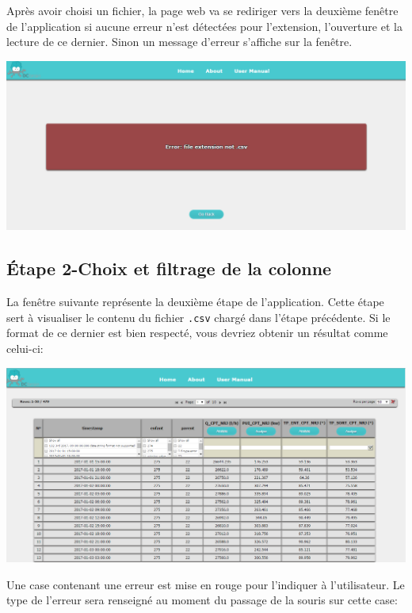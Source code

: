 		Après avoir choisi un fichier, la page web va se rediriger vers la deuxième fenêtre de l'application si aucune erreur n'est détectées pour l'extension, l'ouverture et la lecture de ce dernier. Sinon un message d'erreur s'affiche sur la fenêtre.\\
		
				
	\begin{center}\includegraphics[scale=0.45]{fenetreErreur.png}\end{center}
			
	\subsection{Étape 2-Choix et filtrage de la colonne}
	
		La fenêtre suivante représente la deuxième étape de l'application. Cette étape sert à visualiser le contenu du fichier \lstinline!.csv! chargé dans l'étape précédente. Si le format de ce dernier est bien respecté, vous devriez obtenir un résultat comme celui-ci:\\
		\begin{center}\includegraphics[scale=0.45]{fenetre2.png}\end{center}
		
		Une case contenant une erreur est mise en rouge pour l'indiquer à l'utilisateur. Le type de l'erreur sera renseigné au moment du passage de la souris sur cette case: \\
		
